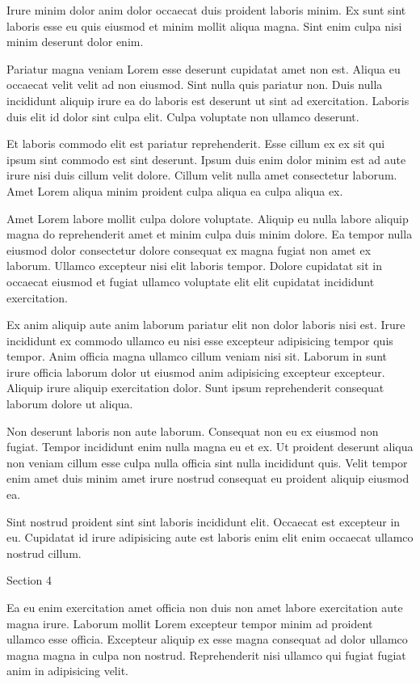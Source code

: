 \documentclass[
    12pt,
    letterpaper,
    oneside,
    noraggedright
]{turabian-researchpaper}
\begin{document}
Irure minim dolor anim dolor occaecat duis proident laboris minim. Ex
sunt sint laboris esse eu quis eiusmod et minim mollit aliqua magna.
Sint enim culpa nisi minim deserunt dolor enim.

Pariatur magna veniam Lorem esse deserunt cupidatat amet non est. Aliqua
eu occaecat velit velit ad non eiusmod. Sint nulla quis pariatur non.
Duis nulla incididunt aliquip irure ea do laboris est deserunt ut sint
ad exercitation. Laboris duis elit id dolor sint culpa elit. Culpa
voluptate non ullamco deserunt.

Et laboris commodo elit est pariatur reprehenderit. Esse cillum ex ex
sit qui ipsum sint commodo est sint deserunt. Ipsum duis enim dolor
minim est ad aute irure nisi duis cillum velit dolore. Cillum velit
nulla amet consectetur laborum. Amet Lorem aliqua minim proident culpa
aliqua ea culpa aliqua ex.

Amet Lorem labore mollit culpa dolore voluptate. Aliquip eu nulla labore
aliquip magna do reprehenderit amet et minim culpa duis minim dolore. Ea
tempor nulla eiusmod dolor consectetur dolore consequat ex magna fugiat
non amet ex laborum. Ullamco excepteur nisi elit laboris tempor. Dolore
cupidatat sit in occaecat eiusmod et fugiat ullamco voluptate elit elit
cupidatat incididunt exercitation.

Ex anim aliquip aute anim laborum pariatur elit non dolor laboris nisi
est. Irure incididunt ex commodo ullamco eu nisi esse excepteur
adipisicing tempor quis tempor. Anim officia magna ullamco cillum veniam
nisi sit. Laborum in sunt irure officia laborum dolor ut eiusmod anim
adipisicing excepteur excepteur. Aliquip irure aliquip exercitation
dolor. Sunt ipsum reprehenderit consequat laborum dolore ut aliqua.

Non deserunt laboris non aute laborum. Consequat non eu ex eiusmod non
fugiat. Tempor incididunt enim nulla magna eu et ex. Ut proident
deserunt aliqua non veniam cillum esse culpa nulla officia sint nulla
incididunt quis. Velit tempor enim amet duis minim amet irure nostrud
consequat eu proident aliquip eiusmod ea.

Sint nostrud proident sint sint laboris incididunt elit. Occaecat est
excepteur in eu. Cupidatat id irure adipisicing aute est laboris enim
elit enim occaecat ullamco nostrud cillum.

Section 4

Ea eu enim exercitation amet officia non duis non amet labore
exercitation aute magna irure. Laborum mollit Lorem excepteur tempor
minim ad proident ullamco esse officia. Excepteur aliquip ex esse magna
consequat ad dolor ullamco magna magna in culpa non nostrud.
Reprehenderit nisi ullamco qui fugiat fugiat anim in adipisicing velit.
\end{document}
